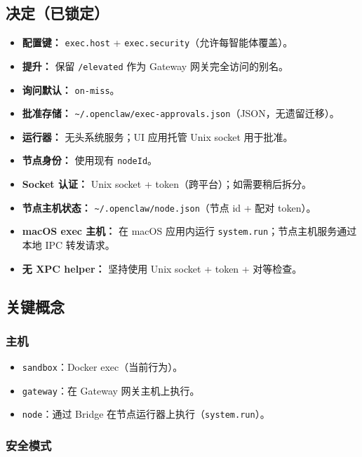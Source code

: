 \subsection{决定（已锁定）}


\begin{itemize}
  \item \textbf{配置键：} \texttt{exec.host} + \texttt{exec.security}（允许每智能体覆盖）。
  \item \textbf{提升：} 保留 \texttt{/elevated} 作为 Gateway 网关完全访问的别名。
  \item \textbf{询问默认：} \texttt{on-miss}。
  \item \textbf{批准存储：} \texttt{\textasciitilde{}/.openclaw/exec-approvals.json}（JSON，无遗留迁移）。
  \item \textbf{运行器：} 无头系统服务；UI 应用托管 Unix socket 用于批准。
  \item \textbf{节点身份：} 使用现有 \texttt{nodeId}。
  \item \textbf{Socket 认证：} Unix socket + token（跨平台）；如需要稍后拆分。
  \item \textbf{节点主机状态：} \texttt{\textasciitilde{}/.openclaw/node.json}（节点 id + 配对 token）。
  \item \textbf{macOS exec 主机：} 在 macOS 应用内运行 \texttt{system.run}；节点主机服务通过本地 IPC 转发请求。
  \item \textbf{无 XPC helper：} 坚持使用 Unix socket + token + 对等检查。
\end{itemize}


\subsection{关键概念}


\subsubsection{主机}


\begin{itemize}
  \item \texttt{sandbox}：Docker exec（当前行为）。
  \item \texttt{gateway}：在 Gateway 网关主机上执行。
  \item \texttt{node}：通过 Bridge 在节点运行器上执行（\texttt{system.run}）。
\end{itemize}


\subsubsection{安全模式}


